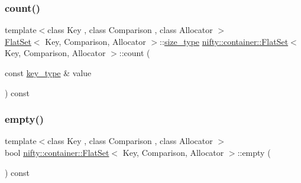 \subsubsection{\texorpdfstring{count()}{count()}}
{\footnotesize\ttfamily template$<$class Key , class Comparison , class Allocator $>$ \\
\hyperlink{classnifty_1_1container_1_1FlatSet}{Flat\+Set}$<$ Key, Comparison, Allocator $>$\+::\hyperlink{classnifty_1_1container_1_1FlatSet_a06ddeba4c1be37279497ed698dfeb812}{size\+\_\+type} \hyperlink{classnifty_1_1container_1_1FlatSet}{nifty\+::container\+::\+Flat\+Set}$<$ Key, Comparison, Allocator $>$\+::count (\begin{DoxyParamCaption}\item[{const \hyperlink{classnifty_1_1container_1_1FlatSet_a0101a4574052389646be8d9bf092a949}{key\+\_\+type} \&}]{value }\end{DoxyParamCaption}) const\hspace{0.3cm}{\ttfamily [inline]}}

\mbox{\label{classnifty_1_1container_1_1FlatSet_a543bb831ef2dd97b6906aabc34d606ac}} 
\subsubsection{\texorpdfstring{empty()}{empty()}}
{\footnotesize\ttfamily template$<$class Key , class Comparison , class Allocator $>$ \\
bool \hyperlink{classnifty_1_1container_1_1FlatSet}{nifty\+::container\+::\+Flat\+Set}$<$ Key, Comparison, Allocator $>$\+::empty (\begin{DoxyParamCaption}{ }\end{DoxyParamCaption}) const\hspace{0.3cm}{\ttfamily [inline]}}

\mbox{\label{classnifty_1_1container_1_1FlatSet_aecdce54d4d18b3b7bfc4605aa9486883}} 
